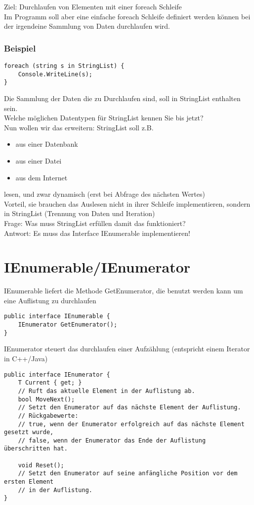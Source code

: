 Ziel: Durchlaufen von Elementen mit einer foreach Schleife\\
Im Programm soll aber eine einfache foreach Schleife definiert werden können bei der irgendeine Sammlung von Daten durchlaufen wird. 


\subsubsection*{Beispiel}
\begin{lstlisting}[language={[Sharp]C}]
foreach (string s in StringList) { 
	Console.WriteLine(s); 
} 
\end{lstlisting}

Die Sammlung der Daten die zu Durchlaufen sind, soll in StringList enthalten sein.\\
Welche möglichen Datentypen für StringList kennen Sie bis jetzt?\\
Nun wollen wir das erweitern: StringList soll z.B. 
\begin{itemize}
\item aus einer Datenbank 
\item aus einer Datei
\item aus dem Internet
\end{itemize}
lesen, und zwar dynamisch (erst bei Abfrage des nächsten Wertes)\\
Vorteil, sie brauchen das Auslesen nicht in ihrer Schleife implementieren, sondern in StringList (Trennung von Daten und Iteration)
\bigskip\\
Frage: Was muss StringList erfüllen damit das funktioniert?\\
Antwort: Es muss das Interface IEnumerable implementieren!
\section{IEnumerable/IEnumerator}
IEnumerable liefert die Methode GetEnumerator, die benutzt werden kann um eine Auflistung zu durchlaufen
\begin{lstlisting}[language={[Sharp]C}]
public interface IEnumerable {
	IEnumerator GetEnumerator();
}
\end{lstlisting}

IEnumerator steuert das durchlaufen einer Aufzählung (entspricht einem Iterator in C++/Java)

\begin{lstlisting}[language={[Sharp]C}]
public interface IEnumerator {
	T Current { get; }  
	// Ruft das aktuelle Element in der Auflistung ab.
	bool MoveNext();
	// Setzt den Enumerator auf das nächste Element der Auflistung.
	// Rückgabewerte:
	// true, wenn der Enumerator erfolgreich auf das nächste Element gesetzt wurde,
	// false, wenn der Enumerator das Ende der Auflistung überschritten hat.

	void Reset();
	// Setzt den Enumerator auf seine anfängliche Position vor dem ersten Element
	// in der Auflistung.
}
\end{lstlisting}

